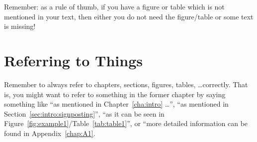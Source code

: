Remember: as a rule of thumb, if you have a figure or table which is
not mentioned in your text, then either you do not need the
figure/table or some text is missing!


\section{Referring to Things}
\label{sec:chap2:referring}

Remember to always refer to chapters, sections, figures, tables,
\ldots correctly. That is, you might want to refer to something in the
former chapter by saying something like ``as mentioned in
Chapter~\ref{cha:intro} \ldots'', ``as mentioned in
Section~\ref{sec:intro:signposting}'', ``as it can be seen
in Figure~\ref{fig:example1}/Table~\ref{tab:table1}'', or ``more
detailed information can be found in Appendix~\ref{chap:A1}.